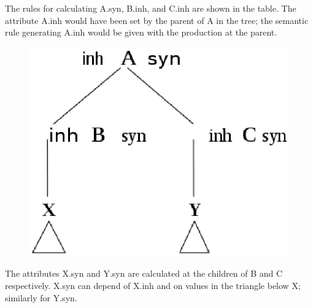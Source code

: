 \documentclass[a4paper,12pt]{article}
\begin{document}
The rules for calculating A.syn, B.inh, and C.inh are shown in the table. The attribute A.inh would have been set by the parent of A in the tree; the semantic rule generating A.inh would be given with the production at the parent. 
\begin{figure}[!bhp]
\centering
\includegraphics[scale=0.4]{q5}
\end{figure}
The attributes X.syn and Y.syn are calculated at the children of B and C respectively. X.syn can depend of X.inh and on values in the triangle below X; similarly for Y.syn. 
\end{document}
